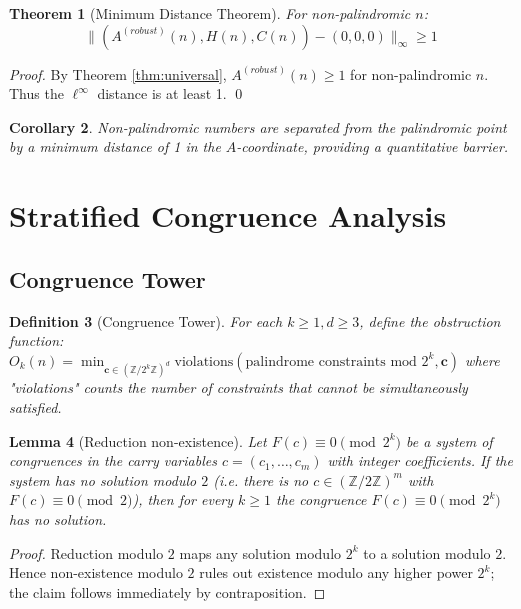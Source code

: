 \documentclass[12pt,a4paper]{article}
\newtheorem{theorem}{Theorem}[section]
\newtheorem{lemma}[theorem]{Lemma}
\newtheorem{definition}[theorem]{Definition}
\newtheorem{corollary}[theorem]{Corollary}
\begin{document}
\begin{theorem}[Minimum Distance Theorem]\label{thm:min_dist}
For non-palindromic $n$:
$$\|(A^{(robust)}(n), H(n), C(n)) - (0,0,0)\|_\infty \geq 1$$
\end{theorem}

\begin{proof}
By Theorem \ref{thm:universal}, $A^{(robust)}(n) \geq 1$ for non-palindromic $n$. Thus the $\ell^\infty$ distance is at least 1. \qed
\end{proof}

\begin{corollary}
Non-palindromic numbers are separated from the palindromic point by a minimum distance of 1 in the $A$-coordinate, providing a quantitative barrier.
\end{corollary}

\section{Stratified Congruence Analysis}

\subsection{Congruence Tower}

\begin{definition}[Congruence Tower]
For each $k \geq 1, d \geq 3$, define the obstruction function:
$O_k(n) = \min_{\mathbf{c} \in (\mathbb{Z}/2^k\mathbb{Z})^d} \text{violations}(\text{palindrome constraints mod } 2^k, \mathbf{c})$
where "violations" counts the number of constraints that cannot be simultaneously satisfied.
\end{definition}

\begin{lemma}[Reduction non-existence]
Let $F(c)\equiv 0\pmod{2^k}$ be a system of congruences in the carry variables $c=(c_1,\dots,c_m)$ with integer coefficients. If the system has no solution modulo $2$ (i.e. there is no $c\in(\mathbb Z/2\mathbb Z)^m$ with $F(c)\equiv0\pmod 2$), then for every $k\ge1$ the congruence $F(c)\equiv0\pmod{2^k}$ has no solution.
\end{lemma}

\begin{proof}
Reduction modulo $2$ maps any solution modulo $2^k$ to a solution modulo $2$. Hence non-existence modulo $2$ rules out existence modulo any higher power $2^k$; the claim follows immediately by contraposition.
\end{proof}
\end{document}
